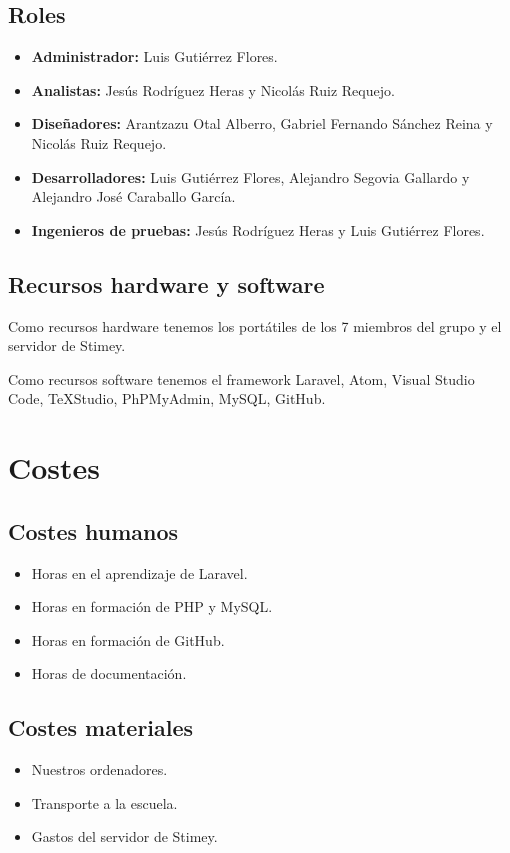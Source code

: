 \subsection{Roles}
\begin{itemize}
	\item \textbf{Administrador:} Luis Gutiérrez Flores.
	\item \textbf{Analistas:} Jesús Rodríguez Heras y Nicolás Ruiz Requejo.
	\item \textbf{Diseñadores:} Arantzazu Otal Alberro, Gabriel Fernando Sánchez Reina y Nicolás Ruiz Requejo.
	\item \textbf{Desarrolladores:} Luis Gutiérrez Flores, Alejandro Segovia Gallardo y Alejandro José Caraballo García.
	\item \textbf{Ingenieros de pruebas:} Jesús Rodríguez Heras y Luis Gutiérrez Flores.
\end{itemize}

\subsection{Recursos hardware y software}
Como recursos hardware tenemos los portátiles de los 7 miembros del grupo y el servidor de Stimey.

Como recursos software tenemos el framework Laravel, Atom, Visual Studio Code, TeXStudio, PhPMyAdmin, MySQL, GitHub.

\section{Costes}
\subsection{Costes humanos}
\begin{itemize}
	\item Horas en el aprendizaje de Laravel.
	\item Horas en formación de PHP y MySQL.
	\item Horas en formación de GitHub.
	\item Horas de documentación.
\end{itemize}

\subsection{Costes materiales}
\begin{itemize}
	\item Nuestros ordenadores.
	\item Transporte a la escuela.
	\item Gastos del servidor de Stimey.
\end{itemize}

